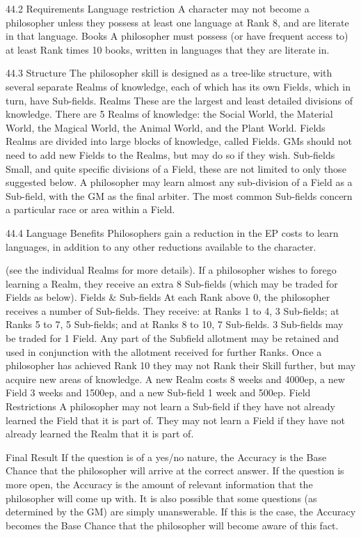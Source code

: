 \documentclass[a4paper]{article}
\begin{document}
\begin{multicols}{3}
44.2 Requirements
Language restriction
A character may not become a philosopher unless
they possess at least one language at Rank 8, and
are literate in that language.
Books
A philosopher must possess (or have frequent
access to) at least Rank times 10 books, written in
languages that they are literate in.

44.3 Structure
The philosopher skill is designed as a tree-like
structure, with several separate Realms of knowledge, each of which has its own Fields, which in
turn, have Sub-fields.
Realms
These are the largest and least detailed divisions of
knowledge. There are 5 Realms of knowledge: the
Social World, the Material World, the Magical
World, the Animal World, and the Plant World.
Fields
Realms are divided into large blocks of knowledge,
called Fields. GMs should not need to add new
Fields to the Realms, but may do so if they wish.
Sub-fields
Small, and quite specific divisions of a Field, these
are not limited to only those suggested below. A
philosopher may learn almost any sub-division of a
Field as a Sub-field, with the GM as the final arbiter. The most common Sub-fields concern a particular race or area within a Field.

44.4 Language Benefits
Philosophers gain a reduction in the EP costs to
learn languages, in addition to any other reductions
available to the character.

(see the individual Realms for more details). If a
philosopher wishes to forego learning a Realm,
they receive an extra 8 Sub-fields (which may be
traded for Fields as below).
Fields & Sub-fields
At each Rank above 0, the philosopher receives a
number of Sub-fields. They receive: at Ranks 1 to
4, 3 Sub-fields; at Ranks 5 to 7, 5 Sub-fields; and
at Ranks 8 to 10, 7 Sub-fields.
3 Sub-fields may be traded for 1 Field. Any part of
the Subfield allotment may be retained and used in
conjunction with the allotment received for further
Ranks. Once a philosopher has achieved Rank 10
they may not Rank their Skill further, but may
acquire new areas of knowledge. A new Realm
costs 8 weeks and 4000ep, a new Field 3 weeks
and 1500ep, and a new Sub-field 1 week and
500ep.
Field Restrictions
A philosopher may not learn a Sub-field if they
have not already learned the Field that it is part of.
They may not learn a Field if they have not already
learned the Realm that it is part of.

Final Result
If the question is of a yes/no nature, the Accuracy
is the Base Chance that the philosopher will arrive
at the correct answer. If the question is more open,
the Accuracy is the amount of relevant information
that the philosopher will come up with. It is also
possible that some questions (as determined by the
GM) are simply unanswerable. If this is the case,
the Accuracy becomes the Base Chance that the
philosopher will become aware of this fact.


\end{multicols}
\end{document}
